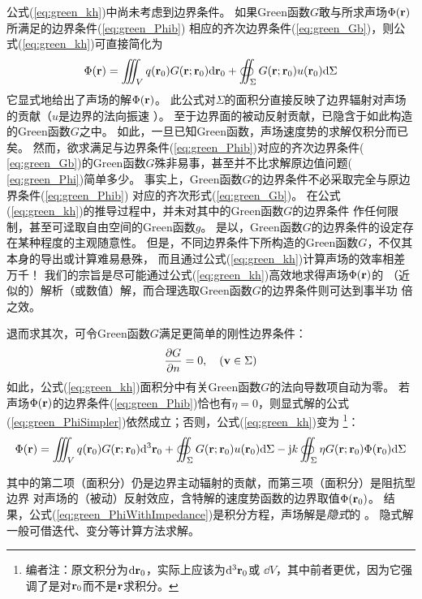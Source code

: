 \documentclass[UTF8]{ctexbook}
\begin{document}
公式(\ref{eq:green_kh})中尚未考虑到边界条件。
如果Green函数$G$敢与所求声场$\Phi(\vb{r})$所满足的边界条件(\ref{eq:green_Phib})
相应的齐次边界条件(\ref{eq:green_Gb})，则公式(\ref{eq:green_kh})可直接简化为
\begin{equation}
	\Phi(\vb{r}) = \iiint_V q(\vb{r}_0) G(\vb{r};\vb{r}_0) \dd \vb{r}_0
	+\oiint_\Sigma G(\vb{r};\vb{r}_0)u(\vb{r}_0) \dd\Sigma
	\label{eq:green_PhiSimpler}
\end{equation}
它显式地给出了声场的解$\Phi(\vb{r})$。
此公式对$\Sigma$的面积分直接反映了边界辐射对声场的贡献（$u$是边界的法向振速
）。
至于边界面的被动反射贡献，已隐含于如此构造的Green函数$G$之中。
如此，一旦已知Green函数，声场速度势的求解仅积分而已矣。
然而，欲求满足与边界条件(\ref{eq:green_Phib})对应的齐次边界条件(
\ref{eq:green_Gb})的Green函数$G$殊非易事，甚至并不比求解原边值问题(
\ref{eq:green_Phi})简单多少。
事实上，Green函数$G$的边界条件不必采取完全与原边界条件(\ref{eq:green_Phib})
对应的齐次形式(\ref{eq:green_Gb})。
在公式(\ref{eq:green_kh})的推导过程中，并未对其中的Green函数$G$的边界条件
作任何限制，甚至可迳取自由空间的Green函数$g$。
是以，Green函数$G$的边界条件的设定存在某种程度的主观随意性。
但是，不同边界条件下所构造的Green函数$G$，不仅其本身的导出或计算难易悬殊，
而且通过公式(\ref{eq:green_kh})计算声场的效率相差万千！
我们的宗旨是尽可能通过公式(\ref{eq:green_kh})高效地求得声场$\Phi(\vb{r})$的
（近似的）解析（或数值）解，而合理选取Green函数$G$的边界条件则可达到事半功
倍之效。

退而求其次，可令Green函数$G$满足更简单的刚性边界条件：
$$\pdv{G}{n}=0\qc \qty(\vb{v}\in\Sigma)$$
如此，公式(\ref{eq:green_kh})面积分中有关Green函数$G$的法向导数项自动为零。
若声场$\Phi(\vb{r})$的边界条件(\ref{eq:green_Phib})恰也有$\eta=0$，则显式解的公式
(\ref{eq:green_PhiSimpler})依然成立；否则，公式(\ref{eq:green_kh})变为
\footnote{编者注：原文积分为$\dd \vb{r}_0$，实际上应该为$\dd^3\vb{r}_0$或
$\dd V$，其中前者更优，因为它强调了是对$\vb{r}_0$而不是$\vb{r}$求积分。}：
\begin{equation}
	\Phi(\vb{r}) = \iiint_V q(\vb{r}_0) G(\vb{r};\vb{r}_0) \dd^3 \vb{r}_0
	+\oiint_\Sigma G(\vb{r};\vb{r}_0) u(\vb{r}_0) \dd \Sigma -\mathrm{j}
	k\oiint_\Sigma \eta G(\vb{r};\vb{r}_0)\Phi(\vb{r}_0)\dd\Sigma
	\label{eq:green_PhiWithImpedance}
\end{equation}

其中的第二项（面积分）仍是边界主动辐射的贡献，而第三项（面积分）是阻抗型边界
对声场的（被动）反射效应，含特解的速度势函数的边界取值$\Phi(\vb{r}_0)$。
结果，公式(\ref{eq:green_PhiWithImpedance})是积分方程，声场解是\emph{隐式}的
。
隐式解一般可借迭代、变分等计算方法求解。
\end{document}
